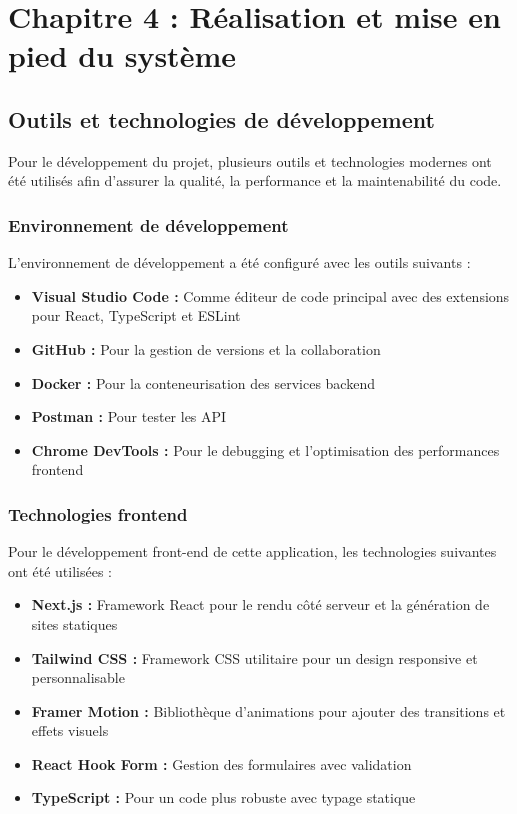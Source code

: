 \chapter{Chapitre 4 : Réalisation et mise en pied du système}
\thispagestyle{fancy}
\newpage

\section{Outils et technologies de développement}
Pour le développement du projet, plusieurs outils et technologies modernes ont été utilisés afin d'assurer la qualité, la performance et la maintenabilité du code.

\subsection{Environnement de développement}
L'environnement de développement a été configuré avec les outils suivants :
\begin{itemize}
  \item \textbf{Visual Studio Code :} Comme éditeur de code principal avec des extensions pour React, TypeScript et ESLint
  \item \textbf{GitHub :} Pour la gestion de versions et la collaboration
  \item \textbf{Docker :} Pour la conteneurisation des services backend
  \item \textbf{Postman :} Pour tester les API
  \item \textbf{Chrome DevTools :} Pour le debugging et l'optimisation des performances frontend
\end{itemize}

\subsection{Technologies frontend}
Pour le développement front-end de cette application, les technologies suivantes ont été utilisées :
\begin{itemize}
  \item \textbf{Next.js :} Framework React pour le rendu côté serveur et la génération de sites statiques
  \item \textbf{Tailwind CSS :} Framework CSS utilitaire pour un design responsive et personnalisable
  \item \textbf{Framer Motion :} Bibliothèque d'animations pour ajouter des transitions et effets visuels
  \item \textbf{React Hook Form :} Gestion des formulaires avec validation
  \item \textbf{TypeScript :} Pour un code plus robuste avec typage statique
\end{itemize}

